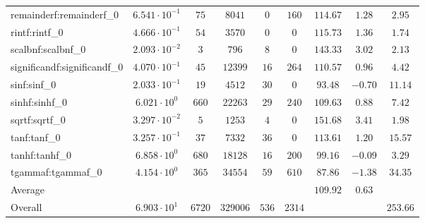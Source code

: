 \begin{tabular}{|l|c|c|c|c|c|c|c|c|}
remainderf:remainderf\_0     & $ 6.541 \cdot 10^{-1} $ & $ 75     $ & $ 8041   $ & $ 0   $ & $ 160  $ & $ 114.67      $ & $ 1.28    $ & $ 2.95    $ \\
rintf:rintf\_0               & $ 4.666 \cdot 10^{-1} $ & $ 54     $ & $ 3570   $ & $ 0   $ & $ 0    $ & $ 115.73      $ & $ 1.36    $ & $ 1.74    $ \\
scalbnf:scalbnf\_0           & $ 2.093 \cdot 10^{-2} $ & $ 3      $ & $ 796    $ & $ 8   $ & $ 0    $ & $ 143.33      $ & $ 3.02    $ & $ 2.13    $ \\
significandf:significandf\_0 & $ 4.070 \cdot 10^{-1} $ & $ 45     $ & $ 12399  $ & $ 16  $ & $ 264  $ & $ 110.57      $ & $ 0.96    $ & $ 4.42    $ \\
sinf:sinf\_0                 & $ 2.033 \cdot 10^{-1} $ & $ 19     $ & $ 4512   $ & $ 30  $ & $ 0    $ & $ 93.48       $ & $ -0.70   $ & $ 11.14   $ \\
sinhf:sinhf\_0               & $ 6.021 \cdot 10^{0}  $ & $ 660    $ & $ 22263  $ & $ 29  $ & $ 240  $ & $ 109.63      $ & $ 0.88    $ & $ 7.42    $ \\
sqrtf:sqrtf\_0               & $ 3.297 \cdot 10^{-2} $ & $ 5      $ & $ 1253   $ & $ 4   $ & $ 0    $ & $ 151.68      $ & $ 3.41    $ & $ 1.98    $ \\
tanf:tanf\_0                 & $ 3.257 \cdot 10^{-1} $ & $ 37     $ & $ 7332   $ & $ 36  $ & $ 0    $ & $ 113.61      $ & $ 1.20    $ & $ 15.57   $ \\
tanhf:tanhf\_0               & $ 6.858 \cdot 10^{0}  $ & $ 680    $ & $ 18128  $ & $ 16  $ & $ 200  $ & $ 99.16       $ & $ -0.09   $ & $ 3.29    $ \\
tgammaf:tgammaf\_0           & $ 4.154 \cdot 10^{0}  $ & $ 365    $ & $ 34554  $ & $ 59  $ & $ 610  $ & $ 87.86       $ & $ -1.38   $ & $ 34.35   $ \\
\hline
Average                      & $                     $ & $        $ & $        $ & $     $ & $      $ & $ 109.92      $ & $ 0.63    $ & $         $ \\
\hline
Overall                      & $ 6.903 \cdot 10^{1}  $ & $ 6720   $ & $ 329006 $ & $ 536 $ & $ 2314 $ & $             $ & $         $ & $ 253.66  $ \\
\hline
\end{tabular}
